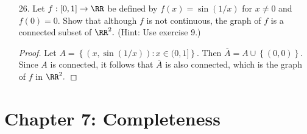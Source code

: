 \documentclass{article}
\begin{document}
\begin{itemize}
\begin{proof}
			If the second condition is true, then $f$ attains a minimum value of $[a, b]$ that is at most as large as $f(c),$ which means $f$ attains a minimum value $n$ over $(a, b)$ as well since $f(a)$ and $f(b)$ are not unique minima. Then the image of $(a, b)$ contains its minimum, contradicting the fact that $f$ is an open map. Thus, $f$ must be strictly monotonic.
		\end{proof}

	\item[26.] Let $f:[0, 1]\to\RR$ be defined by $f(x)=\sin(1/x)$ for $x\neq 0$ and $f(0)=0.$ Show that although $f$ is not continuous, the graph of $f$ is a connected subset of $\RR^2.$ (Hint: Use exercise 9.)
		\begin{proof}
		Let $A=\left\{ (x, \sin(1/x)):x\in(0, 1] \right\}.$ Then $\overline{A}=A\cup\left\{ (0, 0) \right\}.$ Since $A$ is connected, it follows that $\overline{A}$ is also connected, which is the graph of $f$ in $\RR^2.$
		\end{proof}
		
\end{itemize}

\section*{Chapter 7: Completeness}
\end{document}
